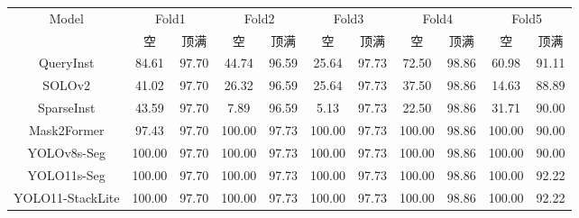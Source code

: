\begin{table}
  \label{tab:empty_full_accuracy}
  \centering
  \begin{tabular}{ccccccccccc}
    \toprule
    Model 
    & \multicolumn{2}{c}{Fold1}
    & \multicolumn{2}{c}{Fold2}
    & \multicolumn{2}{c}{Fold3}
    & \multicolumn{2}{c}{Fold4}
    & \multicolumn{2}{c}{Fold5} \\
    \cmidrule(lr){2-3}\cmidrule(lr){4-5}\cmidrule(lr){6-7}\cmidrule(lr){8-9}\cmidrule(lr){10-11}
     & 空 & 顶满 & 空 & 顶满 & 空 & 顶满 & 空 & 顶满 & 空 & 顶满 \\
    \midrule
    QueryInst 
    & 84.61 & 97.70 & 44.74 & 96.59 & 25.64 & 97.73 & 72.50 & 98.86 & 60.98 & 91.11 \\

    SOLOv2 
    & 41.02 & 97.70 & 26.32 & 96.59 & 25.64 & 97.73 & 37.50 & 98.86 & 14.63 & 88.89 \\

    SparseInst 
    & 43.59 & 97.70 & 7.89 & 96.59 & 5.13 & 97.73 & 22.50 & 98.86 & 31.71 & 90.00 \\

    Mask2Former 
    & 97.43 & 97.70 & 100.00 & 97.73 & 100.00 & 97.73 & 100.00 & 98.86 & 100.00 & 90.00 \\

    YOLOv8s-Seg 
    & 100.00 & 97.70 & 100.00 & 97.73 & 100.00 & 97.73 & 100.00 & 98.86 & 100.00 & 90.00 \\

    YOLO11s-Seg 
    & 100.00 & 97.70 & 100.00 & 97.73 & 100.00 & 97.73 & 100.00 & 98.86 & 100.00 & 92.22 \\

    YOLO11-StackLite 
    & 100.00 & 97.70 & 100.00 & 97.73 & 100.00 & 97.73 & 100.00 & 98.86 & 100.00 & 92.22 \\

    \bottomrule
  \end{tabular}
\end{table}

